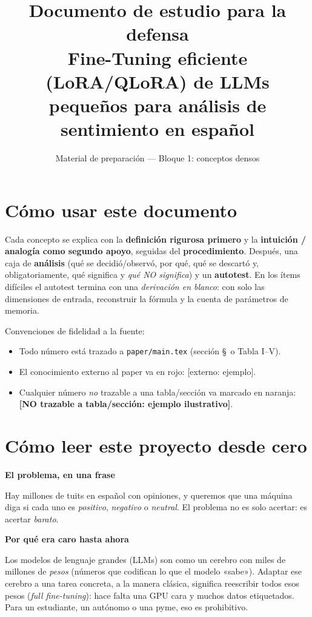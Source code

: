 \documentclass[11pt,a4paper]{article}
\title{\textbf{Documento de estudio para la defensa}\\[2pt]
\large Fine-Tuning eficiente (LoRA/QLoRA) de LLMs pequeños para análisis de sentimiento en español}
\author{Material de preparación --- Bloque 1: conceptos densos}
\date{}
\newcommand{\nivel}[1]{\medskip\noindent\textbf{\textcolor{blue!45!black}{#1}}\par\nopagebreak\smallskip}
\newcommand{\externo}[1]{{\footnotesize\textcolor{red!55!black}{[externo: #1]}}}
\newcommand{\notrace}[1]{{\footnotesize\textcolor{orange!75!black}{\textbf{[NO trazable a tabla/sección: #1]}}}}
\begin{document}
\maketitle

\section*{Cómo usar este documento}
Cada concepto se explica con la \textbf{definición rigurosa primero} y la \textbf{intuición /
analogía como segundo apoyo}, seguidas del \textbf{procedimiento}. Después, una caja de
\textbf{análisis} (qué se decidió/observó, por qué, qué se descartó y, obligatoriamente, qué
significa y \emph{qué NO significa}) y un \textbf{autotest}. En los ítems difíciles el autotest
termina con una \emph{derivación en blanco}: con solo las dimensiones de entrada, reconstruir la
fórmula y la cuenta de parámetros de memoria.

\medskip\noindent Convenciones de fidelidad a la fuente:
\begin{itemize}[nosep]
  \item Todo número está trazado a \texttt{paper/main.tex} (sección \S\ o Tabla I--V).
  \item El conocimiento externo al paper va en rojo: \externo{ejemplo}.
  \item Cualquier número \emph{no} trazable a una tabla/sección va marcado en naranja:
        \notrace{ejemplo ilustrativo}.
\end{itemize}

\section{Cómo leer este proyecto desde cero}

\nivel{El problema, en una frase}
Hay millones de tuits en español con opiniones, y queremos que una máquina diga si cada uno es
\emph{positivo}, \emph{negativo} o \emph{neutral}. El problema no es solo acertar: es acertar
\emph{barato}.

\nivel{Por qué era caro hasta ahora}
Los modelos de lenguaje grandes (LLMs) son como un cerebro con miles de millones de \emph{pesos}
(números que codifican lo que el modelo «sabe»). Adaptar ese cerebro a una tarea concreta, a la
manera clásica, significa reescribir todos esos pesos (\emph{full fine-tuning}): hace falta una
GPU cara y muchos datos etiquetados. Para un estudiante, un autónomo o una pyme, eso es
prohibitivo.
\end{document}
